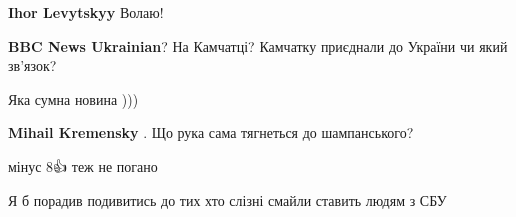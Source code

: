 \begin{itemize}
\begin{itemize}
 
\textbf{Ihor Levytskyy} Волаю!🤣🤣🤣
\end{itemize}

 
\textbf{BBC News Ukrainian}? На Камчатці? Камчатку приєднали до України чи який зв'язок?

 
Яка сумна новина )))

\begin{itemize}
 
\textbf{Mihail Kremensky} . Що рука сама тягнеться до шампанського?
\end{itemize}

 
мінус 8👍 теж не погано

 
Я б порадив подивитись до тих хто слізні смайли ставить людям з СБУ

 

\end{itemize}
